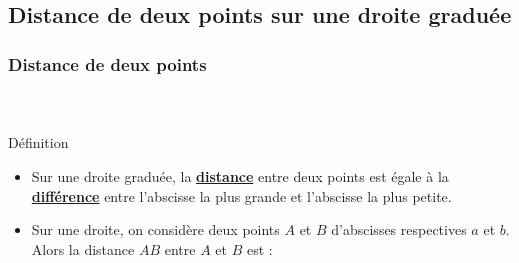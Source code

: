 \documentclass{beamer}
\begin{document}
\subsection{Distance de deux points sur une droite graduée}

\begin{frame}
	\frametitle{Distance de deux points}  
	\framesubtitle{\ }	
	
	\begin{block}{Définition}
		
	\begin{itemize}
		

	\item Sur une droite graduée, la \underline{\textbf{distance}} entre deux points est égale à la \underline{\textbf{différence}} entre l'abscisse la plus grande et l'abscisse la plus petite.\pause
	
		
	\item Sur une droite, on considère deux points $ A $ et $ B $ d'abscisses respectives $ a $ et $ b $. Alors la distance $AB$ entre $A$ et $B$ est :
	
	\begin{columns}[onlytextwidth]
		\begin{column}{0.465\textwidth}
		\end{column}
		\begin{column}{0.465\textwidth}
		\end{column}
	\end{columns}
	

	\end{itemize}	
	\end{block}
	
\end{frame}
\end{document}
